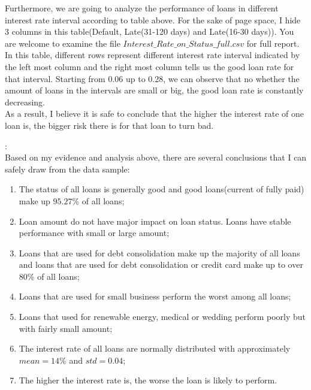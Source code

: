 \documentclass[10pt]{article}
\newenvironment{sect}[2][Section]{\begin{trivlist}
\item[\hskip \labelsep {\bfseries #2}]}{\end{trivlist}}
\begin{document}
\begin{sect}{Interest Rate}
\normalsize
Furthermore, we are going to analyze the performance of loans in different interest rate interval according to table above. For the sake of page space, I hide 3 columns in this table(Default, Late(31-120 days) and Late(16-30 days)). You are welcome to examine the file $Interest\_Rate\_on\_Status\_full.csv$ for full report.\\
In this table, different rows represent different interest rate interval indicated by the left most column and the right most column tells us the good loan rate for that interval. Starting from 0.06 up to 0.28, we can observe that no whether the amount of loans in the intervals are small or big, the good loan rate is constantly decreasing.\\
As a result, I believe it is safe to conclude that the higher the interest rate of one loan is, the bigger risk there is for that loan to turn bad.

\end{sect}

\begin{sect}{Conclusion}
:\\
Based on my evidence and analysis above, there are several conclusions that I can safely draw from the data sample:
\begin{enumerate}
\item[I)] The status of all loans is generally good and good loans(current of fully paid) make up $95.27\%$ of all loans;
\item[II)] Loan amount do not have major impact on loan status. Loans have stable performance with small or large amount;
\item[III)] Loans that are used for debt consolidation make up the majority of all loans and loans that are used for debt consolidation or credit card make up to over $80\%$ of all loans;
\item[IV)] Loans that are used for small business perform the worst among all loans;
\item[V)] Loans that used for renewable energy, medical or wedding perform poorly but with fairly small amount;
\item[VI)] The interest rate of all loans are normally distributed with approximately $mean = 14\%$ and $std = 0.04$;
\item[VII)] The higher the interest rate is, the worse the loan is likely to perform.
\end{enumerate}

\end{sect}

\end{document}
